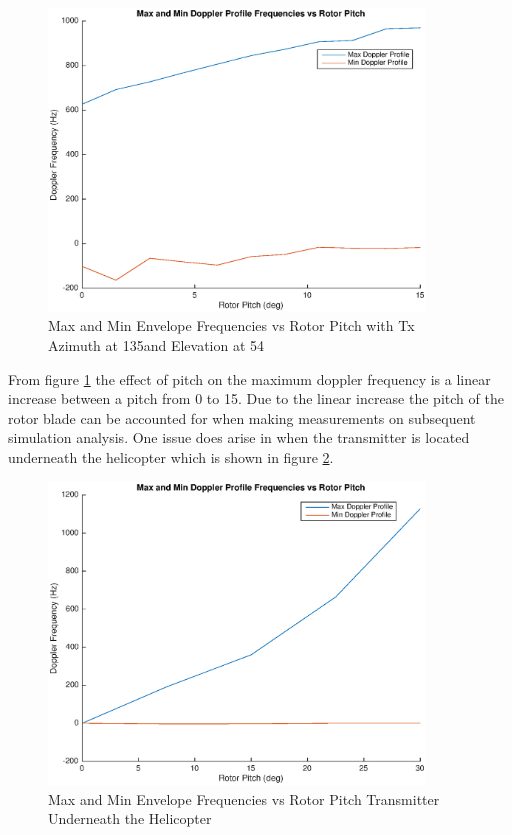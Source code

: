 \begin{figure}
	\begin{center}
		\includegraphics[width=10cm]{images/simulation/pitch_max_doppler.eps}
		\caption{Max and Min Envelope Frequencies vs Rotor Pitch with Tx Azimuth at 135\textdegree \space and Elevation at 54\textdegree}
		\label{fig:pitch_15_135deg}
	\end{center}
\end{figure}

From figure \ref{fig:pitch_15_135deg} the effect of pitch on the maximum doppler frequency is a linear increase between a pitch from 0 \textdegree \space to 15\textdegree. Due to the linear increase the pitch of the rotor blade can be accounted for when making measurements on subsequent simulation analysis. One issue does arise in when the transmitter is located underneath the helicopter which is shown in figure \ref{fig:pitch_tx0}.

\begin{figure}
	\begin{center}
		\includegraphics[width=10cm]{images/simulation/pitch_0txPos_max_doppler.eps}
		\caption{Max and Min Envelope Frequencies vs Rotor Pitch Transmitter Underneath the Helicopter}
		\label{fig:pitch_tx0}
	\end{center}
\end{figure}

